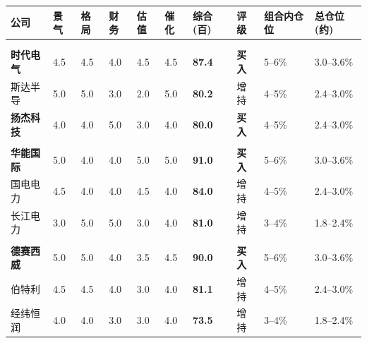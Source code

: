 \begin{exhibitbox}[表8B-19：核心+卫星组合标的五维评分与配置总览]
\centering
\scriptsize
\setlength{\tabcolsep}{2pt}
\begin{tabularx}{\linewidth}{X C{0.7cm} C{0.7cm} C{0.7cm} C{0.7cm} C{0.7cm} C{1.0cm} C{1.1cm} C{1.4cm} C{1.4cm}}
\toprule
\textbf{公司} & \textbf{景气} & \textbf{格局} & \textbf{财务} & \textbf{估值} & \textbf{催化} & \textbf{综合(百)} & \textbf{评级} & \textbf{组合内仓位} & \textbf{总仓位(约)} \\
\midrule
{}
 \\
 \\
\textbf{时代电气} & 4.5 & 4.5 & 4.0 & 4.5 & 4.5 & \textbf{87.4} & \textcolor{riskgreen}{\textbf{买入}} & 5--6\% & 3.0--3.6\% \\
斯达半导 & 5.0 & 5.0 & 3.0 & 2.0 & 5.0 & \textbf{80.2} & 增持 & 4--5\% & 2.4--3.0\% \\
\textbf{扬杰科技} & 4.0 & 4.0 & 5.0 & 3.0 & 4.0 & \textbf{80.0} & \textcolor{riskgreen}{\textbf{买入}} & 4--5\% & 2.4--3.0\% \\
\hline
{}
 \\
\textbf{华能国际} & 5.0 & 4.0 & 4.0 & 5.0 & 5.0 & \textbf{91.0} & \textcolor{riskgreen}{\textbf{买入}} & 5--6\% & 3.0--3.6\% \\
国电电力 & 4.5 & 4.0 & 4.0 & 4.5 & 4.0 & \textbf{84.0} & 增持 & 4--5\% & 2.4--3.0\% \\
长江电力 & 3.0 & 5.0 & 5.0 & 3.0 & 4.0 & \textbf{81.0} & 增持 & 3--4\% & 1.8--2.4\% \\
\hline
{}
 \\
\textbf{德赛西威} & 5.0 & 5.0 & 4.0 & 3.5 & 4.5 & \textbf{90.0} & \textcolor{riskgreen}{\textbf{买入}} & 5--6\% & 3.0--3.6\% \\
伯特利 & 4.5 & 4.5 & 4.0 & 3.0 & 4.0 & \textbf{81.1} & 增持 & 4--5\% & 2.4--3.0\% \\
经纬恒润 & 4.0 & 4.0 & 3.0 & 3.0 & 4.0 & \textbf{73.5} & 增持 & 3--4\% & 1.8--2.4\% \\

\end{tabularx}
\end{exhibitbox}
